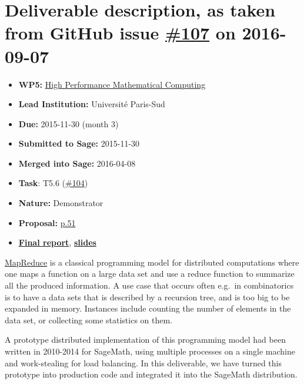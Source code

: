 \section*{\texorpdfstring{Deliverable description, as taken from GitHub
issue
\href{https://github.com/OpenDreamKit/OpenDreamKit/issues/107}{\#107} on
2016-09-07}{Deliverable description, as taken from GitHub issue \#107 on 2016-09-07}}\label{deliverable-description-as-taken-from-github-issues-107-on-2016-09-07}

\begin{itemize}
\tightlist
\item
  \textbf{WP5:}
  \href{https://github.com/OpenDreamKit/OpenDreamKit/tree/master/WP5}{High
  Performance Mathematical Computing}
\item
  \textbf{Lead Institution:} Université Paris-Sud
\item
  \textbf{Due:} 2015-11-30 (month 3)
\item
  \textbf{Submitted to Sage:} 2015-11-30
\item
  \textbf{Merged into Sage:} 2016-04-08
\item
  \textbf{Task}: T5.6
  (\href{https://github.com/OpenDreamKit/OpenDreamKit/issues/104}{\#104})
\item
  \textbf{Nature:} Demonstrator
\item
  \textbf{Proposal:}
  \href{https://github.com/OpenDreamKit/OpenDreamKit/raw/master/Proposal/proposal-www.pdf}{p.51}
\item
  \textbf{\href{https://github.com/OpenDreamKit/OpenDreamKit/raw/master/WP5/D5.1/report-final.pdf}{Final
  report}},
  \textbf{\href{https://github.com/OpenDreamKit/OpenDreamKit/raw/master/WP5/D5.1/slides-final.pdf}{slides}}
\end{itemize}

\href{https://en.wikipedia.org/wiki/MapReduce}{MapReduce} is a classical
programming model for distributed computations where one maps a function
on a large data set and use a reduce function to summarize all the
produced information. A use case that occurs often e.g.~in combinatorics
is to have a data sets that is described by a recursion tree, and is too
big to be expanded in memory. Instances include counting the number of
elements in the data set, or collecting some statistics on them.

A prototype distributed implementation of this programming model had
been written in 2010-2014 for SageMath, using multiple processes on a
single machine and work-stealing for load balancing. In this
deliverable, we have turned this prototype into production code and
integrated it into the SageMath distribution.

